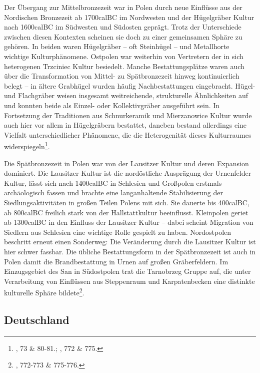 \documentclass[openany,twoside,twocolumn]{book}
\let\rmarkdownfootnote\footnote%
\def\footnote{\protect\rmarkdownfootnote}
\begin{document}
Der Übergang zur Mittelbronzezeit war in Polen durch neue Einflüsse aus der Nordischen Bronzezeit ab 1700calBC im Nordwesten und der Hügelgräber Kultur nach 1600calBC im Südwesten und Südosten geprägt. Trotz der Unterschiede zwischen diesen Kontexten scheinen sie doch zu einer gemeinsamen Sphäre zu gehören. In beiden waren Hügelgräber -- oft Steinhügel -- und Metallhorte wichtige Kulturphänomene. Ostpolen war weiterhin von Vertretern der in sich heterogenen Trzciniec Kultur besiedelt. Manche Bestattungsplätze waren auch über die Transformation von Mittel- zu Spätbronzezeit hinweg kontinuierlich belegt -- in ältere Grabhügel wurden häufig Nachbestattungen eingebracht. Hügel- und Flachgräber weisen insgesamt weitreichende, strukturelle Ähnlichkeiten auf und konnten beide als Einzel- oder Kollektivgräber ausgeführt sein. In Fortsetzung der Traditionen aus Schnurkeramik und Mierzanowice Kultur wurde auch hier vor allem in Hügelgräbern bestattet, daneben bestand allerdings eine Vielfalt unterschiedlicher Phänomene, die die Heterogenität dieses Kulturraumes widerspiegeln\footnote{\textcite{dabrowski_aeltere_2004}, 73 \& 80-81.; \textcite{czebreszuk_bronze_2013}, 772 \& 775.}.

Die Spätbronzezeit in Polen war von der Lausitzer Kultur und deren Expansion dominiert. Die Lausitzer Kultur ist die nordöstliche Ausprägung der Urnenfelder Kultur, lässt sich nach 1400calBC in Schlesien und Großpolen erstmals archäologisch fassen und brachte eine langanhaltende Stabilisierung der Siedlungsaktivitäten in großen Teilen Polens mit sich. Sie dauerte bis 400calBC, ab 800calBC freilich stark von der Hallstattkultur beeinflusst. Kleinpolen geriet ab 1300calBC in den Einfluss der Lausitzer Kultur -- dabei scheint Migration von Siedlern aus Schlesien eine wichtige Rolle gespielt zu haben. Nordostpolen beschritt erneut einen Sonderweg: Die Veränderung durch die Lausitzer Kultur ist hier schwer fassbar. Die übliche Bestattungsform in der Spätbronzezeit ist auch in Polen damit die Brandbestattung in Urnen auf großen Gräberfeldern. Im Einzugsgebiet des San in Südostpolen trat die Tarnobrzeg Gruppe auf, die unter Verarbeitung von Einflüssen aus Steppenraum und Karpatenbecken eine distinkte kulturelle Sphäre bildete\footnote{\textcite{czebreszuk_bronze_2013}, 772-773 \& 775-776.}.

\hypertarget{deutschland}{%
\subsection{Deutschland}\label{deutschland}}
\end{document}
